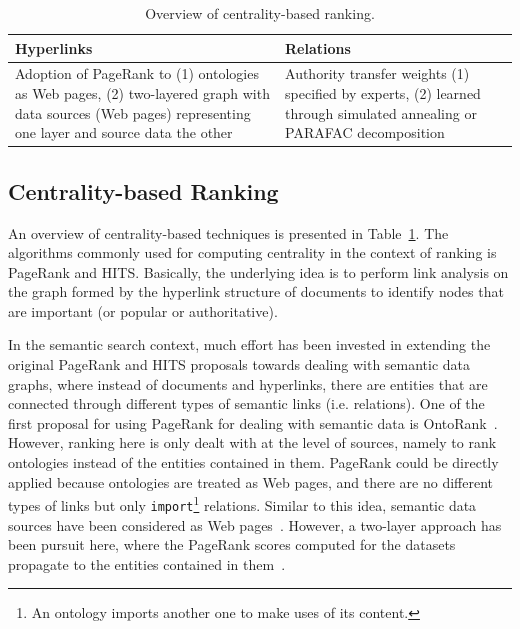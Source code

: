 \begin{table}[htbp]
  \centering
  \caption{Overview of centrality-based ranking.}
    \begin{tabular}{|p{3.7cm}|p{3.4cm}|}
    \hline
    \textbf{Hyperlinks} & \textbf{Relations}  \bigstrut\\
    \hline
    \hline
    Adoption of PageRank to (1) ontologies as Web pages, (2) two-layered graph with data sources (Web pages) representing one layer and source data the other & Authority transfer weights (1) specified by experts, (2) learned through simulated annealing or PARAFAC decomposition \bigstrut\\
    \hline
    \end{tabular}%
  \label{tab:centrality}%
\end{table}%


\subsection{Centrality-based Ranking} An overview of centrality-based techniques is presented in Table~\ref{tab:centrality}. The algorithms commonly used for computing centrality in the context of ranking is PageRank and HITS. Basically, the underlying idea is to perform link analysis on the graph formed by the hyperlink structure of documents to identify nodes that are important (or popular or authoritative). 

In the semantic search context, much effort has been invested in extending the original PageRank and HITS proposals towards dealing with semantic data graphs, where instead of documents and hyperlinks, there are entities that are connected through different types of semantic links (i.e. relations). One of the first proposal for using PageRank for dealing with semantic data is OntoRank~\cite{DBLP:conf/semweb/DingPFJPK05}. However, ranking here is only dealt with at the level of sources, namely to rank ontologies instead of the entities contained in them. PageRank could be directly applied because ontologies are treated as Web pages, and there are no different types of links but only \verb+import+\footnote{An ontology imports another one to make uses of its content.} relations. Similar to this idea, semantic data sources have been considered as Web pages~\cite{DBLP:conf/esws/DelbruTCTD10,DBLP:conf/semweb/HarthKD09}. However, a two-layer approach has been pursuit here, where the PageRank scores computed for the datasets propagate to the entities contained in them~\cite{DBLP:conf/semweb/HarthKD09}. 

